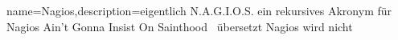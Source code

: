 	
{
	name={Nagios},description={eigentlich N.A.G.I.O.S. ein rekursives Akronym für \glqq Nagios Ain’t Gonna Insist On Sainthood \grqq\ übersetzt \glqq Nagios wird nicht  }}


